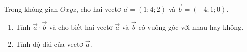 \begin{bt}%

	Trong không gian $Oxyz$, cho hai vectơ $\vec{a}=(1;4;2)$ và $\vec{b}=(-4;1;0)$.
	\begin{enumerate}
		\item Tính $\vec{a} \cdot \vec{b}$ và cho biết hai vectơ $\vec{a}$ và $\vec{b}$ có vuông góc với nhau hay không.
		\item Tính độ dài của vectơ $\overrightarrow{a}$.
	\end{enumerate}
\end{bt}

